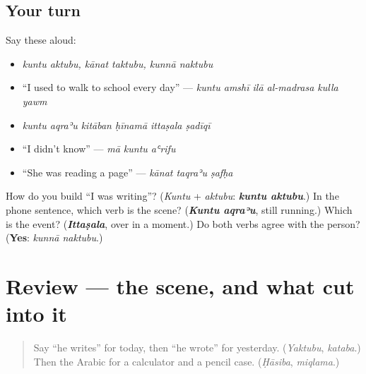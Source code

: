 \subsection*{Your turn}
Say these aloud:

\begin{itemize}
\raggedright
  \item \emph{kuntu aktubu, kānat taktubu, kunnā naktubu}
  \item \textquotedblleft{}I used to walk to school every day\textquotedblright{} — \emph{kuntu amshī ilā al-madrasa kulla yawm}
  \item \emph{kuntu aqraʾu kitāban ḥīnamā ittaṣala ṣadīqī}
  \item \textquotedblleft{}I didn't know\textquotedblright{} — \emph{mā kuntu aʿrifu}
  \item \textquotedblleft{}She was reading a page\textquotedblright{} — \emph{kānat taqraʾu ṣafḥa}
\end{itemize}

\begin{tcolorbox}[breakable,colback=teal!4,colframe=teal!35!black,title={Before you move on}]
How do you build \textquotedblleft{}I was writing\textquotedblright{}? (\emph{Kuntu} + \emph{aktubu}: \emph{\textbf{kuntu aktubu}}.) In the phone sentence, which verb is the scene? (\emph{\textbf{Kuntu aqraʾu}}, still running.) Which is the event? (\emph{\textbf{Ittaṣala}}, over in a moment.) Do both verbs agree with the person? (\textbf{Yes}: \emph{kunnā naktubu}.)
\end{tcolorbox}
\section[(review)]{Review — the scene, and what cut into it}

\label{lesson:AR-R283-the-past-person-by-person}



\begin{quote}
Say \textquotedblleft{}he writes\textquotedblright{} for today, then \textquotedblleft{}he wrote\textquotedblright{} for yesterday. (\emph{Yaktubu}, \emph{kataba}.) Then the Arabic for a calculator and a pencil case. (\emph{Ḥāsiba}, \emph{miqlama}.)
\end{quote}

